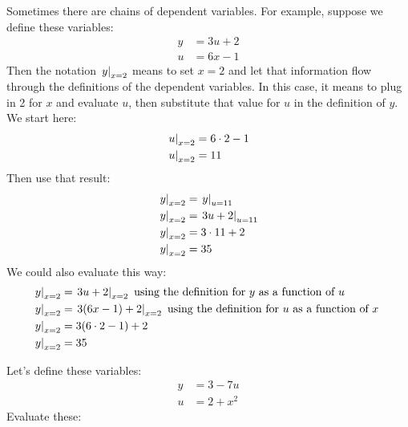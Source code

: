 Sometimes there are chains of dependent variables.
For example, suppose we define these variables:
\begin{equation*}
 \begin{split}
   y &= 3 u + 2 \\
   u &= 6 x - 1
 \end{split}
\end{equation*}
Then the notation $\left.y\right|_{x = 2}$ means to set $x = 2$ and let that information flow through the definitions of the dependent variables.
In this case, it means to plug in 2 for $x$ and evaluate $u$, then substitute that value for $u$ in the definition of $y$.
We start here:
\begin{equation*}
 \begin{split}
   \left.u\right|_{x=2} &= 6 \cdot 2 - 1
   \\
   \left.u\right|_{x=2} &= 11
 \end{split}
\end{equation*}
Then use that result:
\begin{equation*}
 \begin{split}
   \left.y\right|_{x=2} &= \left.y\right|_{u=11}
   \\
   \left.y\right|_{x=2} &= \left.3 u + 2\right|_{u=11}
   \\
   \left.y\right|_{x=2} &= 3 \cdot 11 + 2
   \\
   \left.y\right|_{x=2} &= 35
 \end{split}
\end{equation*}
We could also evaluate this way:
\begin{equation*}
 \begin{split}
   \left.y\right|_{x=2} &= \left.3 u + 2\right|_{x=2} \text{ using the definition for $y$ as a function of $u$ }
   \\
   \left.y\right|_{x=2} &= \left.3 (6x - 1) + 2\right|_{x=2} \text{ using the definition for $u$ as a function of $x$ }
   \\
   \left.y\right|_{x=2} &= 3 (6 \cdot 2 - 1) + 2
   \\
   \left.y\right|_{x=2} &= 35
 \end{split}
\end{equation*}

\newpage

Let's define these variables:
\begin{equation*}
 \begin{split}
   y &= 3 - 7 u \\
   u &= 2 + x^2
 \end{split}
\end{equation*}
Evaluate these:

\begin{multicols}{2}
 \begin{ProblemSet}
 \end{ProblemSet}
\end{multicols}


